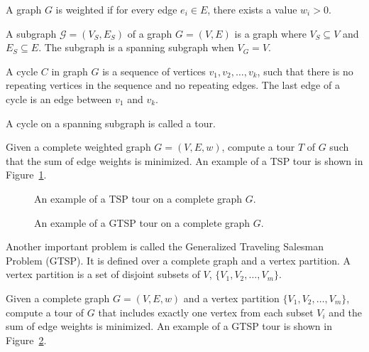 \documentclass[../main.tex]{subfiles}
\begin{document}
\begin{definition}
	A graph $G$ is weighted if for every edge $e_i\in E$, there exists a value $w_i>0$.
\end{definition}
\begin{definition}[Subgraph]
	A subgraph $\mathcal{G}=(V_S,E_S)$ of a graph $G=(V,E)$ is a graph where $V_S\subseteq V$ and $E_S\subseteq E$. The subgraph is a spanning subgraph when $V_G=V$.
\end{definition}
\begin{definition}[Cycle]
	A cycle $C$ in graph $G$ is a sequence of vertices $v_1,v_2,\ldots,v_k$, such that there is no repeating vertices in the sequence and no repeating edges. The last edge of a cycle is an edge between $v_1$ and $v_k$. 
\end{definition}
\begin{definition}[Tour]
	A cycle on a spanning subgraph is called a tour.
\end{definition}

\begin{problem}[TSP]
Given a complete weighted graph $G=(V,E,w)$, compute a tour $T$ of $G$ such that the sum of edge weights is minimized. An example of a TSP tour is shown in Figure~\ref{fig:tsp_tour}.
\end{problem}

\begin{figure}
	\centering
	
	\caption{An example of a TSP tour on a complete graph $G$.}
	\label{fig:tsp_tour}
\end{figure}

\begin{figure}
	\centering
	
	\caption{An example of a GTSP tour on a complete graph $G$.}
	\label{fig:gtsp_tour}
\end{figure}

Another important problem is called the Generalized Traveling Salesman Problem (GTSP). It is defined over a complete graph and a vertex partition. A vertex partition is a set of disjoint subsets of $V$, $\{V_1,V_2,
\ldots,V_m\}$.
\begin{problem}[GTSP]
Given a complete graph $G=(V,E,w)$ and a vertex partition $\{V_1,V_2,\ldots,V_m\}$, compute a tour of $G$ that includes exactly one vertex from each subset $V_i$ and the sum of edge weights is minimized. An example of a GTSP tour is shown in Figure~\ref{fig:gtsp_tour}.
\end{problem}
\end{document}

